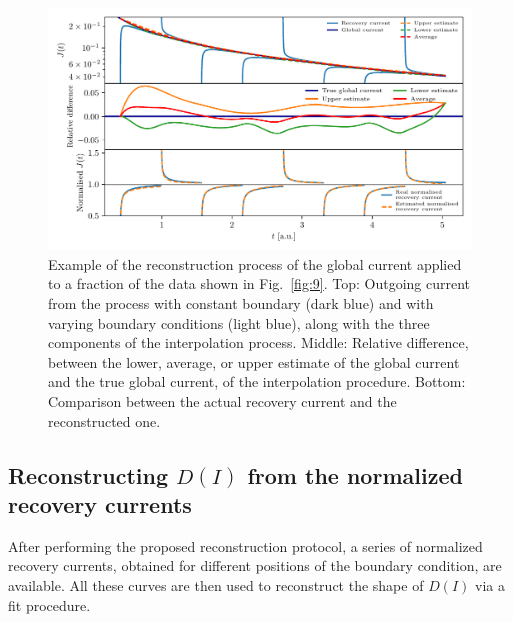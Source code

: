 \begin{figure}[htp]
    \centering    
    \includegraphics[width=\textwidth]{4_probing_the_diffusive_behavior/figs/final/the_interpolation.pdf}
    \caption{Example of the reconstruction process of the global current applied to a fraction of the data shown in Fig.~\ref{fig:9}. Top: Outgoing current from the process with constant boundary (dark blue) and with varying boundary conditions (light blue), along with the three components of the interpolation process. Middle: Relative difference, between the lower, average, or upper estimate of the global current and the true global current, of the interpolation procedure. Bottom: Comparison between the actual recovery current and the reconstructed one.}
    \label{fig:protocol}
\end{figure}


\subsection{Reconstructing $D(I)$ from the normalized recovery currents}


After performing the proposed reconstruction protocol, a series of normalized recovery currents, obtained for different positions of the boundary condition, are available. All these curves are then used to reconstruct the shape of $D(I)$ via a fit procedure.

